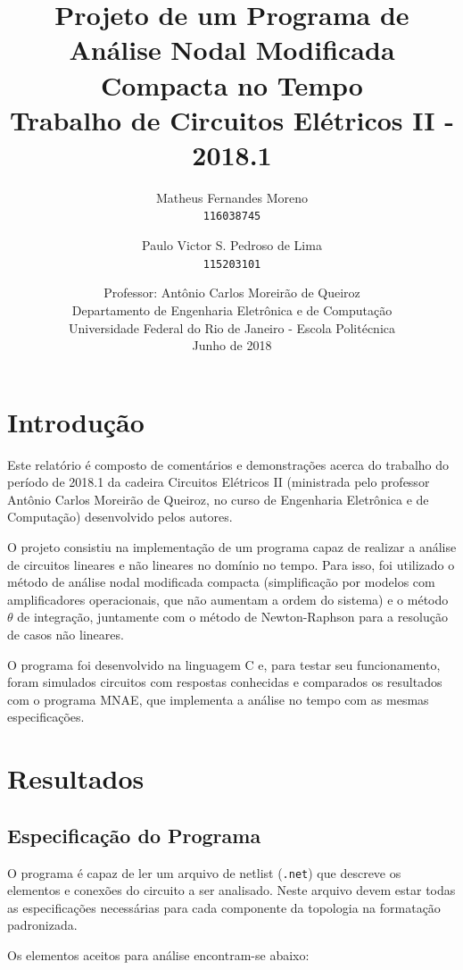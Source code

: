 \documentclass[11pt,titlepage]{article}
\title{\textbf{Projeto de um Programa de Análise Nodal Modificada Compacta no Tempo}\\
\medskip
\large Trabalho de Circuitos Elétricos II - 2018.1}
\author{
  Matheus Fernandes Moreno\\
  \texttt{116038745}
  \and
  Paulo Victor S. Pedroso de Lima\\
  \texttt{115203101}
}
\date{\bigskip
Professor: Antônio Carlos Moreirão de Queiroz\\
\smallskip
Departamento de Engenharia Eletrônica e de Computação\\
\smallskip
Universidade Federal do Rio de Janeiro - Escola Politécnica\\
\bigskip
Junho de 2018}
\begin{document}
\maketitle

\newpage
\tableofcontents


\newpage
\section{Introdução}

Este relatório é composto de comentários e demonstrações acerca do trabalho do período de 2018.1 da cadeira Circuitos Elétricos II (ministrada pelo professor Antônio Carlos Moreirão de Queiroz, no curso de Engenharia Eletrônica e de Computação) desenvolvido pelos autores.

O projeto consistiu na implementação de um programa capaz de realizar a análise de circuitos lineares e não lineares no domínio no tempo. Para isso, foi utilizado o método de análise nodal modificada compacta (simplificação por modelos com amplificadores operacionais, que não aumentam a ordem do sistema) e o \textquotedbl método $\theta$\textquotedbl{} de integração, juntamente com o método de Newton-Raphson para a resolução de casos não lineares.

O programa foi desenvolvido na linguagem C e, para testar seu funcionamento, foram simulados circuitos com respostas conhecidas e comparados os resultados com o programa MNAE, que implementa a análise no tempo com as mesmas especificações.


\newpage
\section{Resultados}

\subsection{Especificação do Programa}

O programa é capaz de ler um arquivo de \textquotedbl netlist\textquotedbl{} (\texttt{.net}) que descreve os elementos e conexões do circuito a ser analisado. Neste arquivo devem estar todas as especificações necessárias para cada componente da topologia na formatação padronizada.

Os elementos aceitos para análise encontram-se abaixo:
\end{document}
